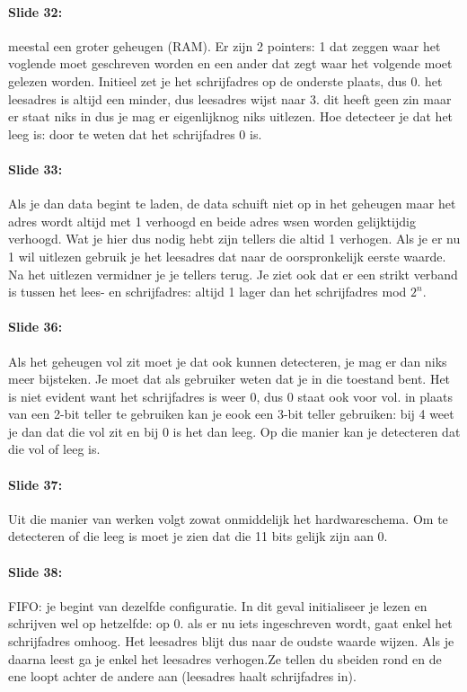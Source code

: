 \documentclass[10pt,a4paper]{book}
\begin{document}
\paragraph{Slide 32:} meestal een groter geheugen (RAM). Er zijn 2 pointers: 1 dat zeggen waar het voglende moet geschreven worden en een ander dat zegt waar het volgende moet gelezen worden. Initieel zet je het schrijfadres op de onderste plaats, dus 0. het leesadres is altijd een minder, dus leesadres wijst naar 3. dit heeft geen zin maar er staat niks in dus je mag er eigenlijknog niks uitlezen. Hoe detecteer je dat het leeg is: door te weten dat het schrijfadres 0 is. 

\paragraph{Slide 33:} Als je dan data begint te laden, de data schuift niet op in het geheugen maar het adres wordt altijd met 1 verhoogd en beide adres wsen worden gelijktijdig verhoogd. Wat je hier dus nodig hebt zijn tellers die altid 1 verhogen. Als je er nu 1 wil uitlezen gebruik je het leesadres dat naar de oorspronkelijk eerste waarde. Na het uitlezen vermidner je je tellers terug. Je ziet ook dat er een strikt verband is tussen het lees- en schrijfadres: altijd 1 lager dan het schrijfadres mod $2^n$.

\paragraph{Slide 36:} Als het geheugen vol zit moet je dat ook kunnen detecteren, je mag er dan niks meer bijsteken. Je moet dat als gebruiker weten dat je in die toestand bent. Het is niet evident want het schrijfadres is weer 0, dus 0 staat ook voor vol. in plaats van een 2-bit teller te gebruiken kan je eook een 3-bit teller gebruiken: bij 4 weet je dan dat die vol zit en bij 0 is het dan leeg. Op die manier kan je detecteren dat die vol of leeg is.

\paragraph{Slide 37:} Uit die manier van werken volgt zowat onmiddelijk het hardwareschema. Om te detecteren of die leeg is moet je zien dat die 11 bits gelijk zijn aan 0.

\paragraph{Slide 38:} FIFO: je begint van dezelfde configuratie. In dit geval initialiseer je lezen en schrijven wel op hetzelfde: op 0. als er nu iets ingeschreven wordt, gaat enkel het schrijfadres omhoog. Het leesadres blijt dus naar de oudste waarde wijzen. Als je daarna leest ga je enkel het leesadres verhogen.Ze tellen du sbeiden rond en de ene loopt achter de andere aan (leesadres haalt schrijfadres in).
\end{document}
